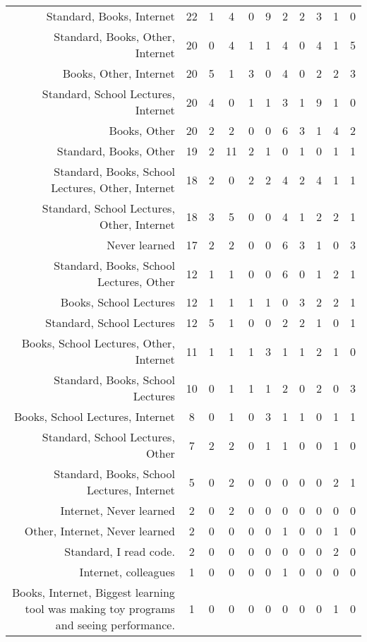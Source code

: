 {\begin{landscape}
\begin{longtable}[htb]{r|c|c|c|c|c|c|c|c|c|c}
{Standard, Books, Internet} & 22 & 1 & 4 & 0 & 9 & 2 & 2 & 3 & 1 & 0 \\%
{Standard, Books, Other, Internet} & 20 & 0 & 4 & 1 & 1 & 4 & 0 & 4 & 1 & 5 \\%
{Books, Other, Internet} & 20 & 5 & 1 & 3 & 0 & 4 & 0 & 2 & 2 & 3 \\%
{Standard, School Lectures, Internet} & 20 & 4 & 0 & 1 & 1 & 3 & 1 & 9 & 1 & 0 \\%
{Books, Other} & 20 & 2 & 2 & 0 & 0 & 6 & 3 & 1 & 4 & 2 \\%
{Standard, Books, Other} & 19 & 2 & 11 & 2 & 1 & 0 & 1 & 0 & 1 & 1 \\%
{Standard, Books, School Lectures, Other, Internet} & 18 & 2 & 0 & 2 & 2 & 4 & 2 & 4 & 1 & 1 \\%
{Standard, School Lectures, Other, Internet} & 18 & 3 & 5 & 0 & 0 & 4 & 1 & 2 & 2 & 1 \\%
{Never learned} & 17 & 2 & 2 & 0 & 0 & 6 & 3 & 1 & 0 & 3 \\%
{Standard, Books, School Lectures, Other} & 12 & 1 & 1 & 0 & 0 & 6 & 0 & 1 & 2 & 1 \\%
{Books, School Lectures} & 12 & 1 & 1 & 1 & 1 & 0 & 3 & 2 & 2 & 1 \\%
{Standard, School Lectures} & 12 & 5 & 1 & 0 & 0 & 2 & 2 & 1 & 0 & 1 \\%
{Books, School Lectures, Other, Internet} & 11 & 1 & 1 & 1 & 3 & 1 & 1 & 2 & 1 & 0 \\%
{Standard, Books, School Lectures} & 10 & 0 & 1 & 1 & 1 & 2 & 0 & 2 & 0 & 3 \\%
{Books, School Lectures, Internet} & 8 & 0 & 1 & 0 & 3 & 1 & 1 & 0 & 1 & 1 \\%
{Standard, School Lectures, Other} & 7 & 2 & 2 & 0 & 1 & 1 & 0 & 0 & 1 & 0 \\%
{Standard, Books, School Lectures, Internet} & 5 & 0 & 2 & 0 & 0 & 0 & 0 & 0 & 2 & 1 \\%
{Internet, Never learned} & 2 & 0 & 2 & 0 & 0 & 0 & 0 & 0 & 0 & 0 \\%
{Other, Internet, Never learned} & 2 & 0 & 0 & 0 & 0 & 1 & 0 & 0 & 1 & 0 \\%
{Standard, I read code.} & 2 & 0 & 0 & 0 & 0 & 0 & 0 & 0 & 2 & 0 \\%
{Internet, colleagues} & 1 & 0 & 0 & 0 & 0 & 1 & 0 & 0 & 0 & 0 \\%
{Books, Internet, Biggest learning tool was making toy programs and seeing performance.} & 1 & 0 & 0 & 0 & 0 & 0 & 0 & 0 & 1 & 0 \\%

\end{longtable}
\end{landscape}}
